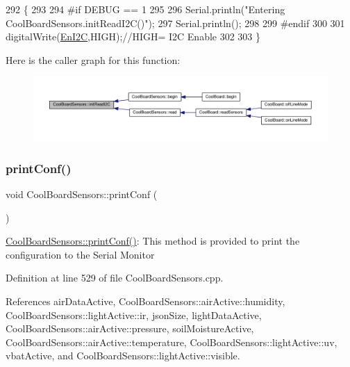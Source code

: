 \begin{DoxyCode}
292 \{
293 
294 \textcolor{preprocessor}{#if DEBUG == 1}
295 
296     Serial.println(\textcolor{stringliteral}{"Entering CoolBoardSensors.initReadI2C()"});
297     Serial.println();
298 
299 \textcolor{preprocessor}{#endif}
300  
301     digitalWrite(\hyperlink{classCoolBoardSensors_aaa6b5dbf3a6633bffd9d204d961096dc}{EnI2C},HIGH);\textcolor{comment}{//HIGH= I2C Enable}
302 
303 \}
\end{DoxyCode}
Here is the caller graph for this function\+:\nopagebreak
\begin{figure}[H]
\begin{center}
\leavevmode
\includegraphics[width=350pt]{classCoolBoardSensors_acad6a8418c66d36868caca23c844ecb6_icgraph}
\end{center}
\end{figure}
\mbox{\label{classCoolBoardSensors_af6fd79505815b204c178617ecf54c873}} 
\subsubsection{\texorpdfstring{print\+Conf()}{printConf()}}
{\footnotesize\ttfamily void Cool\+Board\+Sensors\+::print\+Conf (\begin{DoxyParamCaption}{ }\end{DoxyParamCaption})}

\hyperlink{classCoolBoardSensors_af6fd79505815b204c178617ecf54c873}{Cool\+Board\+Sensors\+::print\+Conf()}\+: This method is provided to print the configuration to the Serial Monitor 

Definition at line 529 of file Cool\+Board\+Sensors.\+cpp.



References air\+Data\+Active, Cool\+Board\+Sensors\+::air\+Active\+::humidity, Cool\+Board\+Sensors\+::light\+Active\+::ir, json\+Size, light\+Data\+Active, Cool\+Board\+Sensors\+::air\+Active\+::pressure, soil\+Moisture\+Active, Cool\+Board\+Sensors\+::air\+Active\+::temperature, Cool\+Board\+Sensors\+::light\+Active\+::uv, vbat\+Active, and Cool\+Board\+Sensors\+::light\+Active\+::visible.



